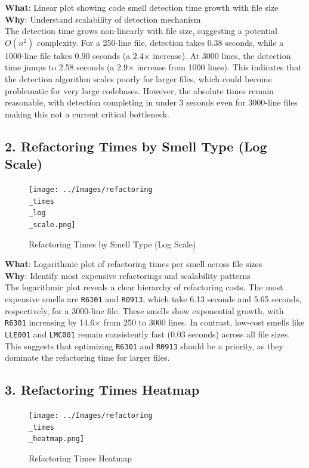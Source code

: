 \documentclass[12pt, titlepage]{article}
\begin{document}
\noindent \textbf{What}: Linear plot showing code smell detection
time growth with file size\\

\noindent \textbf{Why}: Understand scalability of detection mechanism\\

The detection time grows non-linearly with file size, suggesting a
potential \(O(n^2)\) complexity.
For a 250-line file, detection takes 0.38 seconds, while a 1000-line
file takes 0.90 seconds (a 2.4×
increase). At 3000 lines, the detection time jumps to 2.58 seconds (a
2.9× increase from 1000 lines).
This indicates that the detection algorithm scales poorly for larger
files, which could become
problematic for very large codebases. However, the absolute times
remain reasonable, with detection
completing in under 3 seconds even for 3000-line files making this
not a current critical bottleneck.

\subsection*{2. Refactoring Times by Smell Type (Log Scale)}
\begin{figure}[H]
  \centering
  \texttt{[image: ../Images/refactoring\\\_times\\\_log\\\_scale.png]}
  \caption{Refactoring Times by Smell Type (Log Scale)}
\end{figure}

\noindent \textbf{What}: Logarithmic plot of refactoring times per
smell across file sizes\\

\noindent \textbf{Why}: Identify most expensive refactorings and
scalability patterns\\

The logarithmic plot reveals a clear hierarchy of refactoring costs.
The most expensive smells are \texttt{R6301} and \texttt{R0913},
which take 6.13 seconds and 5.65 seconds, respectively, for a
3000-line file. These smells show exponential growth, with
\texttt{R6301} increasing by 14.6× from 250 to 3000 lines. In
contrast, low-cost smells like \texttt{LLE001} and \texttt{LMC001}
remain consistently fast (0.03 seconds) across all file sizes. This
suggests that optimizing \texttt{R6301} and \texttt{R0913} should be
a priority, as they dominate the refactoring time for larger files.

\subsection*{3. Refactoring Times Heatmap}
\begin{figure}[H]
  \centering
  \texttt{[image: ../Images/refactoring\\\_times\\\_heatmap.png]}
  \caption{Refactoring Times Heatmap}
\end{figure}
\end{document}
